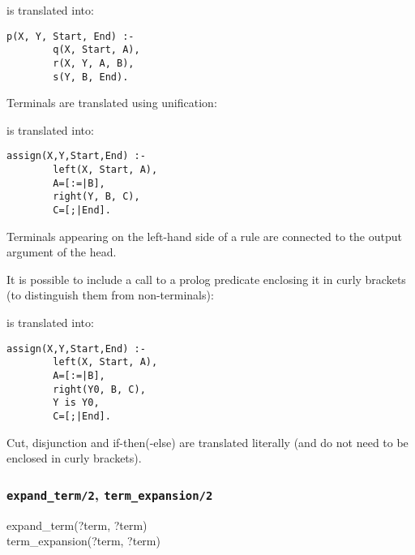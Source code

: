 is translated into:

\begin{Indentation}
\begin{verbatim}
p(X, Y, Start, End) :-
        q(X, Start, A),
        r(X, Y, A, B),
        s(Y, B, End).
\end{verbatim}
\end{Indentation}

Terminals are translated using unification:


is translated into:

\begin{Indentation}
\begin{verbatim}
assign(X,Y,Start,End) :-
        left(X, Start, A),
        A=[:=|B],
        right(Y, B, C),
        C=[;|End].
\end{verbatim}
\end{Indentation}

Terminals appearing on the left-hand side of a rule are connected to the
output argument of the head.

It is possible to include a call to a prolog predicate enclosing it in curly
brackets (to distinguish them from non-terminals):


is translated into:

\begin{Indentation}
\begin{verbatim}
assign(X,Y,Start,End) :-
        left(X, Start, A),
        A=[:=|B],
        right(Y0, B, C),
        Y is Y0,
        C=[;|End].
\end{verbatim}
\end{Indentation}

Cut, disjunction and if-then(-else) are translated literally (and do not need
to be enclosed in curly brackets).

\subsubsection{\texttt{expand\_term/2},
               \texttt{term\_expansion/2}}
\label{expand-term/2}

\begin{TemplatesOneCol}
expand\_term(?term, ?term)\\
term\_expansion(?term, ?term)

\end{TemplatesOneCol}

